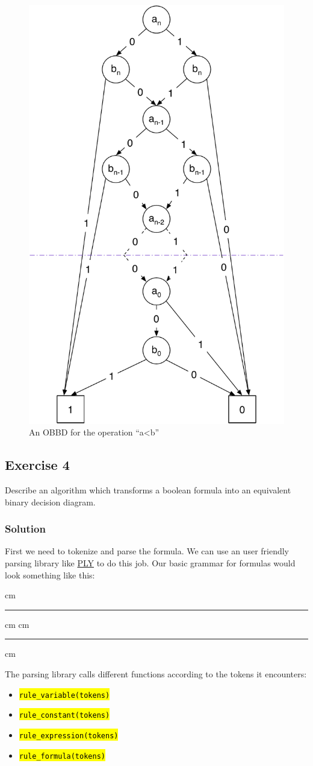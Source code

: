 \documentclass[a4paper, 11pt]{article}
\newcommand{\codeinput}[1]
{
    \vskip 0.3 cm
    {\color{lightgray}\hrule}\vskip 0.3 cm
    {\fontsize{9pt}{11pt}}
    \vskip 0.3 cm{\color{lightgray}\hrule}
    \vskip 0.3 cm
}
\newcommand{\code}[1]
{
    \hl{\texttt{#1}}
}
\begin{document}
\begin{figure}[h]
  \centering
    \includegraphics[width=.54\textwidth]{Figures/OBDD Smaller.pdf}
  \caption{An OBBD for the operation “a<b”}
  \label{fig:Figures_OBDD_Smaller}
\end{figure}

\subsection{Exercise 4}

Describe an algorithm which transforms a boolean formula into an equivalent binary decision diagram.

\subsubsection{Solution}

First we need to tokenize and parse the formula. We can use an user friendly parsing library like \href{http://www.dabeaz.com/ply/}{PLY} to do this job. Our basic grammar for formulas would look something like this:

\codeinput{boolean_formula}

The parsing library calls different functions according to the tokens it encounters:

\begin{itemize}
    \item \code{rule\_variable(tokens)}
    \item \code{rule\_constant(tokens)}
    \item \code{rule\_expression(tokens)}
    \item \code{rule\_formula(tokens)}
\end{itemize}
\end{document}
